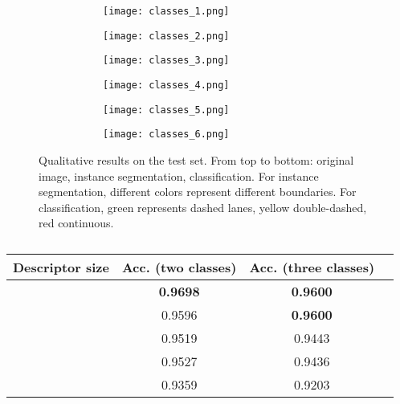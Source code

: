 \documentclass[runningheads]{llncs}
\begin{document}
\begin{figure}[h!]
\begin{subfigure}{\linewidth}
  \hfill
\end{subfigure}
\begin{subfigure}{\linewidth}
  \begin{subfigure}{0.15\linewidth}
    \texttt{[image: classes\_1.png]}
  \end{subfigure}
  \hfill
  \begin{subfigure}{0.15\linewidth}
    \texttt{[image: classes\_2.png]}
  \end{subfigure}
  \hfill
  \begin{subfigure}{0.15\linewidth}
    \texttt{[image: classes\_3.png]}
  \end{subfigure}
  \hfill
  \begin{subfigure}{0.15\linewidth}
    \texttt{[image: classes\_4.png]}
  \end{subfigure}
  \hfill
  \begin{subfigure}{0.15\linewidth}
    \texttt{[image: classes\_5.png]}
  \end{subfigure}
  \hfill
  \begin{subfigure}{0.15\linewidth}
    \texttt{[image: classes\_6.png]}
  \end{subfigure}
  \hfill
\end{subfigure}
\caption{Qualitative results on the test set. From top to bottom: original image, instance segmentation, classification. For instance segmentation, different colors represent different boundaries. For classification, green represents dashed lanes, yellow double-dashed, red continuous.}
\label{results_images}

\end{figure}
\begin{table}
  \caption{}
  \label{table:results}
  \setlength{\tabcolsep}{4\tabcolsep}\centering

  \begin{tabular}{ *{4}{c} }
    \toprule
    \textbf{Descriptor size} & \textbf{Acc. (two classes)} &  \textbf{Acc. (three classes)}\\
    \midrule
     & \textbf{0.9698} & \textbf{0.9600} \\
     & 0.9596 & \textbf{0.9600} \\
     & 0.9519 & 0.9443 \\
     & 0.9527 & 0.9436 \\
     & 0.9359 & 0.9203 \\
    \bottomrule
  \end{tabular}
  \vspace{1pt}
\end{table}
 
\end{document}
